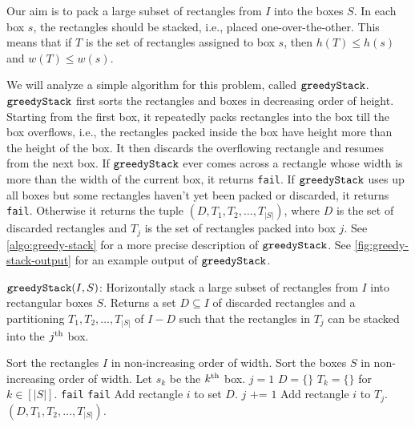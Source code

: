 Our aim is to pack a large subset of rectangles from $I$ into the boxes $S$.
In each box $s$, the rectangles should be stacked, i.e., placed one-over-the-other.
This means that if $T$ is the set of rectangles assigned to box $s$,
then $h(T) \le h(s)$ and $w(T) \le w(s)$.

We will analyze a simple algorithm for this problem, called $\operatorname{\mathtt{greedyStack}}$.
$\operatorname{\mathtt{greedyStack}}$ first sorts the rectangles and boxes in decreasing order of height.
Starting from the first box, it repeatedly packs rectangles into the box
till the box overflows, i.e., the rectangles packed inside the box
have height more than the height of the box.
It then discards the overflowing rectangle and resumes from the next box.
If $\operatorname{\mathtt{greedyStack}}$ ever comes across a rectangle whose width is more than
the width of the current box, it returns \texttt{fail}.
If $\operatorname{\mathtt{greedyStack}}$ uses up all boxes but some rectangles haven't yet been
packed or discarded, it returns \texttt{fail}.
Otherwise it returns the tuple $(D, T_1, T_2, \ldots, T_{|S|})$,
where $D$ is the set of discarded rectangles
and $T_j$ is the set of rectangles packed into box $j$.
See \cref{algo:greedy-stack} for a more precise description of $\operatorname{\mathtt{greedyStack}}$.
See \cref{fig:greedy-stack-output} for an example output of $\operatorname{\mathtt{greedyStack}}$.

\begin{algorithm}[htb]
\caption{$\operatorname{\mathtt{greedyStack}}(I, S)$:
Horizontally stack a large subset of rectangles from $I$ into rectangular boxes $S$.
Returns a set $D \subseteq I$ of discarded rectangles and a partitioning
$T_1, T_2, \ldots, T_{|S|}$ of $I-D$ such that the rectangles in $T_j$
can be stacked into the $j^{\textrm{th}}$ box.}
\label{algo:greedy-stack}
\begin{algorithmic}[1]
\State Sort the rectangles $I$ in non-increasing order of width.
\State Sort the boxes $S$ in non-increasing order of width. Let $s_k$ be the $k^{\textrm{th}}$ box.
\State $j = 1$
\State $D = \{\}$ 
\State $T_k = \{\}$ for $k \in [|S|]$. 
        \State \label{alg-line:greedy-stack:fail-1}\Return \texttt{fail}
        \State \label{alg-line:greedy-stack:fail-2} \Return \texttt{fail}
        \State Add rectangle $i$ to set $D$.
        \State $j \texttt{ += } 1$
    \Else
        \State \label{alg-line:greedy-stack:stack} Add rectangle $i$ to $T_j$.
    \EndIf
\EndFor
\State \Return $(D, T_1, T_2, \ldots, T_{|S|})$.
\end{algorithmic}
\end{algorithm}

